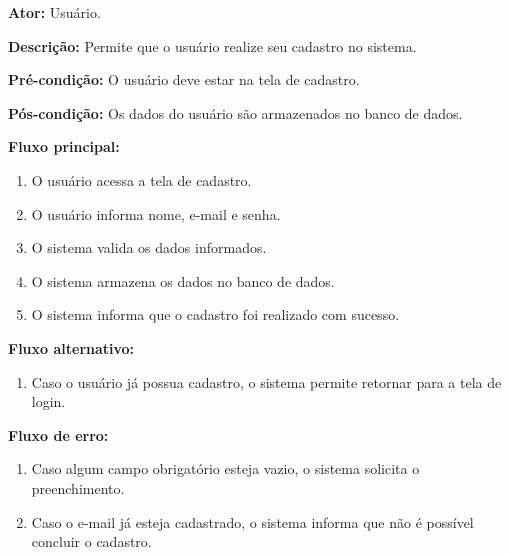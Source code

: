 \documentclass[12pt,oneside,a4paper,brazil,final]{abntex2}
\begin{document}
\textbf{Ator:} Usuário.



\textbf{Descrição:} Permite que o usuário realize seu cadastro no sistema.



\textbf{Pré-condição:} O usuário deve estar na tela de cadastro.



\textbf{Pós-condição:} Os dados do usuário são armazenados no banco de dados.



\textbf{Fluxo principal:}

\begin{enumerate}

    \item O usuário acessa a tela de cadastro.

    \item O usuário informa nome, e-mail e senha.

    \item O sistema valida os dados informados.

    \item O sistema armazena os dados no banco de dados.

    \item O sistema informa que o cadastro foi realizado com sucesso.

\end{enumerate}



\textbf{Fluxo alternativo:}

\begin{enumerate}

    \item Caso o usuário já possua cadastro, o sistema permite retornar para a tela de login.

\end{enumerate}



\textbf{Fluxo de erro:}

\begin{enumerate}

    \item Caso algum campo obrigatório esteja vazio, o sistema solicita o preenchimento.

    \item Caso o e-mail já esteja cadastrado, o sistema informa que não é possível concluir o cadastro.

\end{enumerate}
\end{document}

